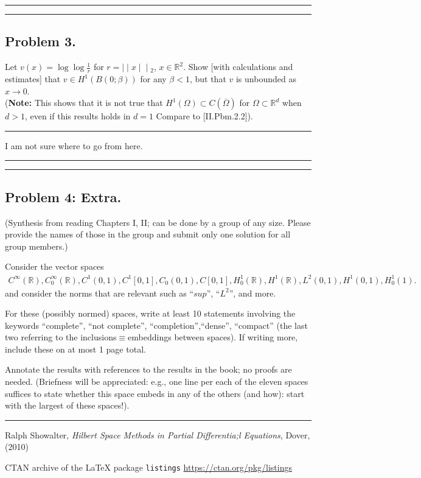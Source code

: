 \documentclass[12pt]{amsart}
\newcommand{\R}{\mathbb{R}}
\newcommand{\norm}[2]{\mid\!\mid\! #1\!\mid\!\mid\!_{#2}}
\begin{document}
\medskip \hrule \hrule \medskip


\subsection*{Problem 3.}
Let $v(x)=\log \log \frac{1}{r}$ for $r = \norm{x}{2}$, $x \in \R^2$. Show [with calculations and estimates] that $v \in H^1(B(0;\beta))$ for any $\beta<1$, but that $v$ is unbounded as $x \to 0$. \\

({\bf Note:} This shows that it is not true that $H^1(\Omega) \subset C(\overline{\Omega})$ for $\Omega\subset \R^d$ when $d>1$, even if this results holds in $d=1$ Compare to [II.Pbm.2.2]). \\
\medskip \hrule \medskip

 I am not sure where to go from here.

\medskip \hrule \hrule \medskip


\subsection*{Problem 4: {\bf Extra.}} (Synthesis from reading Chapters I, II; can be done by a group of any size. Please provide the names of those in the group and submit only one solution for all group members.)

Consider the vector spaces
\begin{align*}
C^{\infty}(\R), 
C_0^{\infty}(\R),C^1(0,1),C^1[0,1],C_0(0,1),C[0,1], H_0^1(\R),H^1(\R),L^2(0,1),H^1(0,1),H_0^1(1).
\end{align*}
and consider the norms that are relevant such as ``$sup$'', ``$L^2$'', and more. 

For these (possibly normed) spaces, write at least 10 statements involving the keywords ``complete'', ``not complete'', ``completion'',``dense'', ``compact'' (the last two referring to the inclusions$\equiv$embeddings between spaces). If writing more, include these on at most 1 page total. 

Annotate the results with references to the results in the book; no proofs are needed. (Briefness will be appreciated: e.g., one line per each of the eleven spaces suffices to state whether this space embeds in any of the others (and how): start with the largest of these spaces!).
\medskip \hrule \medskip




\begin{thebibliography}{9}
 Ralph Showalter, \emph{Hilbert Space Methods in Partial Differentia;l Equations}, Dover, (2010)

 CTAN archive of the LaTeX package {\tt listings} \url{https://ctan.org/pkg/listings}
\end{thebibliography}
\end{document}
